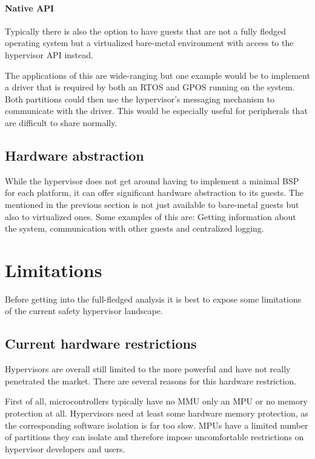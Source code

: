 \paragraph{Native \gls{API}}
Typically there is also the option to have guests that are not a fully fledged operating system but a virtualized bare-metal environment with access to the hypervisor \gls{API} instead. 

The applications of this are wide-ranging but one example would be to implement a driver that is required by both an \gls{RTOS} and \gls{GPOS} running on the system. Both partitions could then use the hypervisor's messaging mechanism to communicate with the driver. This would be especially useful for peripherals that are difficult to share normally.
\subsection{Hardware abstraction}
While the hypervisor does not get around having to implement a minimal \gls{BSP} for each platform, it can offer significant hardware abstraction to its guests. The  mentioned in the previous section is not just available to bare-metal guests but also to virtualized ones. Some examples of this are: Getting information about the system, communication with other guests and centralized logging.


\section{Limitations}
Before getting into the full-fledged analysis it is best to expose some limitations of the current safety hypervisor landscape. 
\subsection{Current hardware restrictions}
Hypervisors are overall still limited to the more powerful  and have not really penetrated the  market. There are several reasons for this hardware restriction. 

First of all, microcontrollers typically have no \gls{MMU} only an \gls{MPU} or no memory protection at all. Hypervisors need at least some hardware memory protection, as the corresponding software isolation is far too slow. \gls{MPU}s have a limited number of partitions they can isolate and therefore impose uncomfortable restrictions on hypervisor developers and users.

